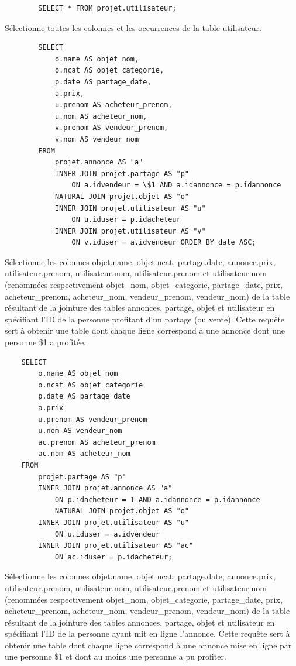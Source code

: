 \documentclass[a4paper,12pt]{article}
\begin{document}
\begin{spacing}{1}
	\begin{verbatim}
	    SELECT * FROM projet.utilisateur;
	\end{verbatim}
	Sélectionne toutes les colonnes et les occurrences de la table utilisateur.
	
	\begin{verbatim}
	    SELECT
    	    o.name AS objet_nom,
    	    o.ncat AS objet_categorie,
    	    p.date AS partage_date,
    	    a.prix,
    	    u.prenom AS acheteur_prenom,
    	    u.nom AS acheteur_nom,
    	    v.prenom AS vendeur_prenom,
    	    v.nom AS vendeur_nom
	    FROM
        	projet.annonce AS "a"
        	INNER JOIN projet.partage AS "p"
        	    ON a.idvendeur = \$1 AND a.idannonce = p.idannonce
        	NATURAL JOIN projet.objet AS "o"
        	INNER JOIN projet.utilisateur AS "u"
        	    ON u.iduser = p.idacheteur
        	INNER JOIN projet.utilisateur AS "v"
        	    ON v.iduser = a.idvendeur ORDER BY date ASC;
    \end{verbatim}
Sélectionne les colonnes objet.name, objet.ncat, partage.date, annonce.prix, utilisateur.prenom, utilisateur.nom, utilisateur.prenom et utilisateur.nom (renommées respectivement objet\_nom, objet\_categorie, partage\_date, prix, acheteur\_prenom, acheteur\_nom, vendeur\_prenom, vendeur\_nom) de la table résultant de la jointure des tables annonces, partage, objet et utilisateur en spécifiant l'ID de la personne profitant d'un partage (ou vente).
Cette requête sert à obtenir une table dont chaque ligne correspond à une annonce dont une personne \$1 a profitée.

    \begin{verbatim}
    SELECT
        o.name AS objet_nom
        o.ncat AS objet_categorie
        p.date AS partage_date
        a.prix
        u.prenom AS vendeur_prenom
        u.nom AS vendeur_nom
        ac.prenom AS acheteur_prenom
        ac.nom AS acheteur_nom
    FROM
        projet.partage AS "p"
        INNER JOIN projet.annonce AS "a"
            ON p.idacheteur = 1 AND a.idannonce = p.idannonce
            NATURAL JOIN projet.objet AS "o"
        INNER JOIN projet.utilisateur AS "u"
            ON u.iduser = a.idvendeur 
        INNER JOIN projet.utilisateur AS "ac"
            ON ac.iduser = p.idacheteur;
	\end{verbatim}
Sélectionne les colonnes objet.name, objet.ncat, partage.date, annonce.prix, utilisateur.prenom, utilisateur.nom, utilisateur.prenom et utilisateur.nom (renommées respectivement objet\_nom, objet\_categorie, partage\_date, prix, acheteur\_prenom, acheteur\_nom, vendeur\_prenom, vendeur\_nom) de la table résultant de la jointure des tables annonces, partage, objet et utilisateur en spécifiant l'ID de la personne ayant mit en ligne l'annonce.
Cette requête sert à obtenir une table dont chaque ligne correspond à une annonce mise en ligne par une personne \$1 et dont au moins une personne a pu profiter.


\end{spacing}
\end{document}
